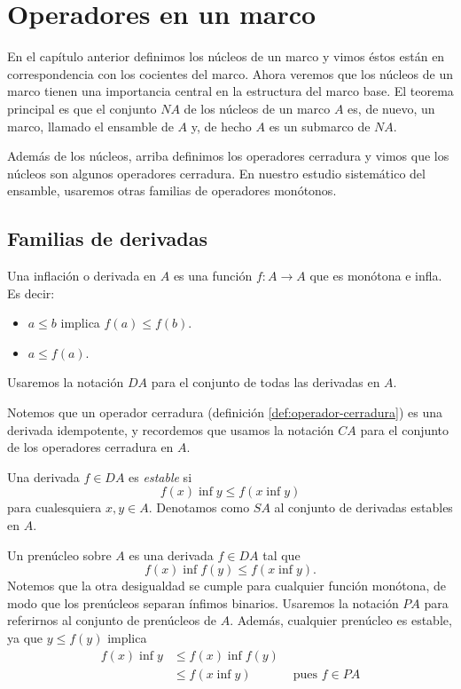\chapter{Operadores en un marco}




En el capítulo anterior definimos los núcleos de un marco y vimos
éstos están en correspondencia con los cocientes del marco.
Ahora veremos que los núcleos de un marco tienen una importancia
central en la estructura del marco base.
El teorema principal es que el conjunto $NA$ de los núcleos de un
marco $A$ es, de nuevo, un marco, llamado el
ensamble de $A$ y, de hecho $A$ es un submarco de $NA$.

Además de los núcleos, arriba definimos los operadores cerradura
y vimos que los núcleos son algunos operadores cerradura.
En nuestro estudio sistemático del ensamble, usaremos otras
familias de operadores monótonos.

\section{Familias de derivadas}

\begin{definition}[Derivadas]
  Una inflación o derivada en $A$ es una función $f:A\to A$ que
  es monótona e infla.
  Es decir:
  \begin{itemize}
    \item $a\leq b$ implica $f(a) \leq f(b)$.
    \item $a\leq f(a)$.
  \end{itemize}
  Usaremos la notación $DA$ para el conjunto de todas las
  derivadas en $A$.
\end{definition}
Notemos que un operador cerradura (definición
\ref{def:operador-cerradura}) es una derivada idempotente, y
recordemos que usamos la notación $CA$ para el conjunto de los 
operadores cerradura en $A$.

\begin{definition}
  Una derivada $f\in DA$ es \emph{estable} si
  \[
    f(x)\inf y \leq f(x\inf y)
  \]
  para cualesquiera $x,y\in A$.
  Denotamos como $SA$ al conjunto de derivadas estables en $A$.
\end{definition}

\begin{definition}[Prenúcleos]
  Un prenúcleo sobre $A$ es una derivada $f\in DA$ tal que
  \[
    f(x)\inf f(y) \leq f(x\inf y)
  .\]
  Notemos que la otra desigualdad se cumple para cualquier
  función monótona, de modo que los prenúcleos separan ínfimos
  binarios.
  Usaremos la notación $PA$ para referirnos al conjunto de
  prenúcleos de $A$.
  Además, cualquier prenúcleo es estable, ya que $y\leq f(y)$ implica
  \begin{align*}
    f(x) \inf y
    &\leq f(x) \inf f(y) \\
    &\leq f(x\inf y) & \text{ pues $f\in PA$}
  \end{align*}
\end{definition}

